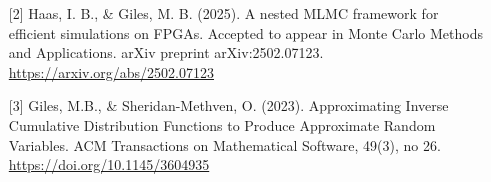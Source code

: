 \begin{talk}
\begin{enumerate}
    \item[{[2]}] Haas, I. B., \& Giles, M. B. (2025). A nested MLMC framework for efficient simulations on FPGAs. Accepted to appear in Monte Carlo Methods and Applications. arXiv preprint arXiv:2502.07123. \url{https://arxiv.org/abs/2502.07123}

     \item[{[3]}] Giles, M.B., \& Sheridan-Methven, O. (2023). Approximating Inverse Cumulative Distribution Functions to Produce Approximate Random Variables. ACM Transactions on Mathematical Software, 49(3), no 26. \url{https://doi.org/10.1145/3604935}
\end{enumerate}

\end{talk}

